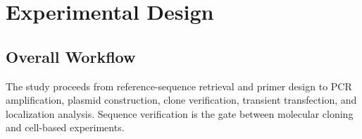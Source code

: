 \section{Experimental Design}
\subsection{Overall Workflow}
The study proceeds from reference-sequence retrieval and primer design to PCR amplification, plasmid construction, clone verification, transient transfection, and localization analysis. Sequence verification is the gate between molecular cloning and cell-based experiments.




